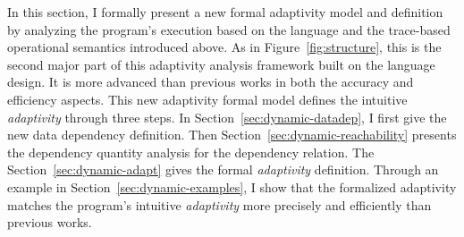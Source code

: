 In this section, 
I formally present a new formal adaptivity model and definition
by analyzing the program's execution based on the language and the trace-based operational semantics introduced above.
As in Figure~\ref{fig:structure}, this is the second major part of this adaptivity analysis framework
built on the language design. 
It is more advanced than previous works
in both the accuracy and efficiency aspects.
This new adaptivity formal model defines the intuitive \emph{adaptivity} through three steps.
In Section~\ref{sec:dynamic-datadep}, I first give the new data dependency definition.
Then Section~\ref{sec:dynamic-reachability} presents the dependency quantity analysis for the dependency relation.
The  Section~\ref{sec:dynamic-adapt} gives the formal \emph{adaptivity} definition.
Through an example in Section~\ref{sec:dynamic-examples}, I show that the formalized
adaptivity matches the program's intuitive \emph{adaptivity} more precisely and efficiently than previous works.

